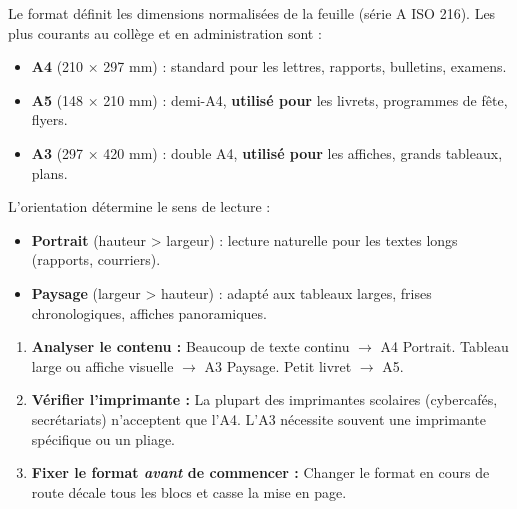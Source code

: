 \documentclass[11pt]{article}
\newcommand{\cle}[1]{{\popxbold\color{popdark}#1}}
\begin{document}
\begin{definition}
Le \cle{format} définit les dimensions normalisées de la feuille (série A ISO 216). Les plus courants au collège et en administration sont :
\begin{itemize}
    \item \textbf{A4} (210 × 297 mm) : standard pour les lettres, rapports, bulletins, examens.
    \item \textbf{A5} (148 × 210 mm) : demi-A4, \textbf{utilisé pour} les livrets, programmes de fête, flyers.
    \item \textbf{A3} (297 × 420 mm) : double A4, \textbf{utilisé pour} les affiches, grands tableaux, plans.
\end{itemize}
L'\cle{orientation} détermine le sens de lecture :
\begin{itemize}
    \item \textbf{Portrait} (hauteur > largeur) : lecture naturelle pour les textes longs (rapports, courriers).
    \item \textbf{Paysage} (largeur > hauteur) : adapté aux tableaux larges, frises chronologiques, affiches panoramiques.
\end{itemize}
\end{definition}

\begin{methode}
\begin{enumerate}
    \item \textbf{Analyser le contenu :} Beaucoup de texte continu $\rightarrow$ A4 Portrait. Tableau large ou affiche visuelle $\rightarrow$ A3 Paysage. Petit livret $\rightarrow$ A5.
    \item \textbf{Vérifier l'imprimante :} La plupart des imprimantes scolaires (cybercafés, secrétariats) n'acceptent que l'A4. L'A3 nécessite souvent une imprimante spécifique ou un pliage.
    \item \textbf{Fixer le format \emph{avant} de commencer :} Changer le format en cours de route décale tous les blocs et casse la mise en page.
\end{enumerate}
\end{methode}
\end{document}
